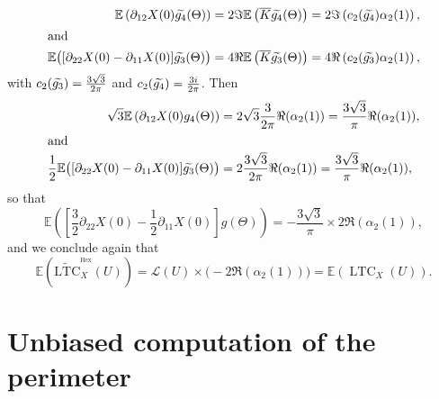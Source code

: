 \documentclass[AHL,Unicode,longabstracts,published]{cedram}
\newcommand{\E}{\mathbb{E}}
\DeclareMathOperator{\LTC}{LTC}
\DeclareMathOperator{\Hex}{Hex}
\newcommand{\tLTC}{\widetilde{\mathrm{LTC}}}
\newcommand{\calL}{\mathcal{L}}
\let\oldtilde\tilde
\renewcommand*{\tilde}[1]{\mathchoice{\widetilde{#1}}{\widetilde{#1}}{\oldtilde{#1}}{\oldtilde{#1}}}
\begin{document}
\begin{align*}
\E\left(\partial_{12}X(0)\tilde{g_4}(\Theta)\right) &=2\Im \E\left(\overline{K}\tilde{g_4}(\Theta)\right)
=2 \Im \left(c_2(\tilde{g_4})\alpha_2(1)\right),
\\
\intertext{and}
\E\big([\partial_{22}X(0)-\partial_{11}X(0)]\tilde{g_3}(\Theta)\big) &=4\Re \E\left(\overline{K}\tilde{g_3}(\Theta)\right)
=4 \Re \left(c_2(\tilde{g_3})\alpha_2(1)\right),
\end{align*}
with $c_2(\tilde{g_3})=\frac{3\sqrt{3}}{2\pi}$ and $c_2(\tilde{g_4})=\frac{3i}{2\pi}$. Then
\begin{align*}
\sqrt{3}\E\left(\partial_{12}X(0)g_4(\Theta)\right) &=2\sqrt{3}\frac{3}{2\pi}\Re(\alpha_2(1))=\frac{3\sqrt{3}}{\pi}\Re(\alpha_2(1)),
\\
\intertext{and}
\frac{1}{2}\E\big([\partial_{22}X(0)-\partial_{11}X(0)]\tilde{g_3}(\Theta)\big) &=2\frac{3\sqrt{3}}{2\pi}\Re(\alpha_2(1))=\frac{3\sqrt{3}}{\pi}\Re(\alpha_2(1)),
\end{align*}
so that
\[
\E\left(\left[\frac{3}{2}\partial_{22}X(0)
-\frac{1}{2}\partial_{11}X(0)\right]g(\Theta)\right)=-\frac{3\sqrt{3}}{\pi}\times 2\Re(\alpha_2(1)),
\]
and we conclude again that
\[
\E\left(\tLTC^{^{\Hex}}_{X}(U)\right)={\calL}(U)\times \big(-2\Re(\alpha_2(1))\big)=\E\left(\LTC_X(U)\right).
\]

\section{Unbiased computation of the perimeter}\label{unbiased:app}
\end{document}
